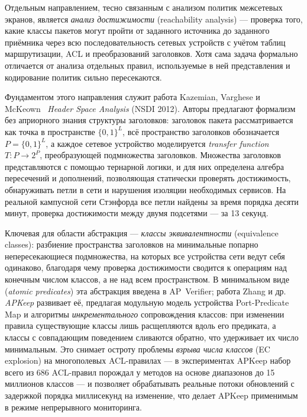 Отдельным направлением, тесно связанным с анализом политик межсетевых экранов, является \emph{анализ достижимости} (reachability analysis) --- проверка того, какие классы пакетов могут пройти от заданного источника до заданного приёмника через всю последовательность сетевых устройств с учётом таблиц маршрутизации, ACL и преобразований заголовков. Хотя сама задача формально отличается от анализа отдельных правил, используемые в ней представления и кодирование политик сильно пересекаются.

Фундаментом этого направления служит работа Kazemian, Varghese и McKeown~\cite{kazemian2012header} \emph{Header Space Analysis} (NSDI 2012). Авторы предлагают формализм без априорного знания структуры заголовков: заголовок пакета рассматривается как точка в пространстве $\{0, 1\}^L$, всё пространство заголовков обозначается $P = \{0, 1\}^L$, а каждое сетевое устройство моделируется \emph{transfer function} $T : P \to 2^P$, преобразующей подмножества заголовков. Множества заголовков представляются с помощью тернарной логики, и для них определена алгебра пересечений и дополнений, позволяющая статически проверять достижимость, обнаруживать петли в сети и нарушения изоляции необходимых сервисов. На реальной кампусной сети Стэнфорда все петли найдены за время порядка десяти минут, проверка достижимости между двумя подсетями --- за 13 секунд.

Ключевая для области абстракция --- \emph{классы эквивалентности} (equivalence classes): разбиение пространства заголовков на минимальные попарно непересекающиеся подмножества, на которых все устройства сети ведут себя одинаково, благодаря чему проверка достижимости сводится к операциям над конечным числом классов, а не над всем пространством. В минимальном виде (\emph{atomic predicates}) эта абстракция введена в AP~Verifier; работа Zhang и др.~\cite{zhang2020apkeep} \emph{APKeep} развивает её, предлагая модульную модель устройства Port-Predicate Map и алгоритмы \emph{инкрементального} сопровождения классов: при изменении правила существующие классы лишь расщепляются вдоль его предиката, а классы с совпадающим поведением сливаются обратно, что удерживает их число минимальным. Это снимает остроту проблемы \emph{взрыва числа классов} (EC explosion) на многополевых ACL-правилах --- в экспериментах APKeep набор всего из 686 ACL-правил порождал у методов на основе диапазонов до 15 миллионов классов --- и позволяет обрабатывать реальные потоки обновлений с задержкой порядка миллисекунд на изменение, что делает APKeep применимым в режиме непрерывного мониторинга.

